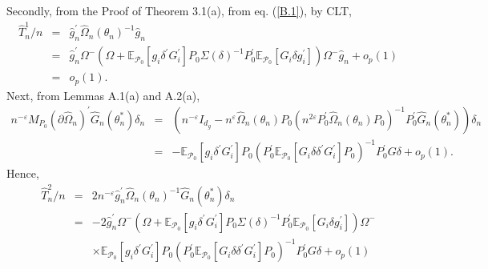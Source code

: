 \documentclass[hidelinks, 11 pt, a4paper, pdflatex]{article}
\begin{document}
{   Secondly, from the Proof of Theorem 3.1(a), from eq. (\ref{B.1}), by CLT,
    \begin{eqnarray}
     \hat{T}_{n}^{1}/n & = & \hat{g}_{n}^{\prime}\hat{\Omega}_{n}(\theta_{n})^{-1}\hat{g}_{n}  \nonumber \\
                       & = & \hat{g}_{n}^{\prime}\Omega^{-}
                              (\Omega + \mathbb{E}_{\mathcal{P}_{0}}[g_{i}\delta^{\prime }G_{i}^{\prime}]
                              P_{0}\Sigma(\delta)^{-1}P_{0}^{\prime}
                              \mathbb{E}_{\mathcal{P}_{0}}[G_{i}\delta g_{i}^{\prime }])
                              \Omega ^{-}\hat{g}_{n} + o_{p}(1) \nonumber \\
                       & = & o_{p}(1). \label{B.4}
    \end{eqnarray}%
   Next, from Lemmas A.1(a) and A.2(a),
    \begin{eqnarray*}
     n^{-\varepsilon }M_{P_{0}}(\partial \hat{\Omega}_{n})^{\prime}\hat{G}_{n}(\theta_{n}^{\ast})\delta_{n}
      & = & (n^{-\varepsilon}I_{d_{g}}
             - n^{\varepsilon}\hat{\Omega}_{n}(\theta_{n})P_{0}
               (n^{2\varepsilon}P_{0}^{\prime}\hat{\Omega}_{n}(\theta_{n})P_{0})^{-1}
               P_{0}^{\prime}\hat{G}_{n}(\theta_{n}^{\ast}))\delta _{n} \\
      & = & - \mathbb{E}_{\mathcal{P}_{0}}[g_{i}\delta ^{\prime}G_{i}^{\prime}]P_{0}
               (P_{0}^{\prime}\mathbb{E}_{\mathcal{P}_{0}}[G_{i}\delta \delta^{\prime}G_{i}^{\prime}]P_{0})^{-1}
               P_{0}^{\prime}G\delta + o_{p}(1).
    \end{eqnarray*}%
   Hence,
    \begin{eqnarray}
     \hat{T}_{n}^{2}/n & = & 2n^{-\varepsilon}\hat{g}_{n}^{\prime}\hat{\Omega}_{n}(\theta_{n})^{-1}\hat{G}_{n}(\theta_{n}^{\ast })\delta _{n}  \nonumber \\
                       & = & -2\hat{g}_{n}^{\prime}\Omega^{-}
                               (\Omega
                                + \mathbb{E}_{\mathcal{P}_{0}}[g_{i}\delta^{\prime}G_{i}^{\prime}]
                                  P_{0}\Sigma(\delta)^{-1}P_{0}^{\prime}
                                  \mathbb{E}_{\mathcal{P}_{0}}[G_{i}\delta g_{i}^{\prime }])
                               \Omega^{-}  \nonumber \\
                       &   & \times \mathbb{E}_{\mathcal{P}_{0}}[g_{i}\delta^{\prime}G_{i}^{\prime}]
                                     P_{0}(P_{0}^{\prime}\mathbb{E}_{\mathcal{P}_{0}}[G_{i}\delta \delta^{\prime}G_{i}^{\prime}]P_{0})^{-1}P_{0}^{\prime}G\delta + o_{p}(1)  \nonumber \\

\end{eqnarray}}
\end{document}
